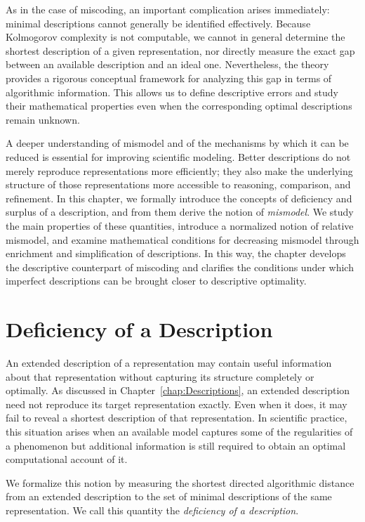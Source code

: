 As in the case of miscoding, an important complication arises immediately: minimal descriptions cannot generally be identified effectively. Because Kolmogorov complexity is not computable, we cannot in general determine the shortest description of a given representation, nor directly measure the exact gap between an available description and an ideal one. Nevertheless, the theory provides a rigorous conceptual framework for analyzing this gap in terms of algorithmic information. This allows us to define descriptive errors and study their mathematical properties even when the corresponding optimal descriptions remain unknown.

A deeper understanding of mismodel and of the mechanisms by which it can be reduced is essential for improving scientific modeling. Better descriptions do not merely reproduce representations more efficiently; they also make the underlying structure of those representations more accessible to reasoning, comparison, and refinement. In this chapter, we formally introduce the concepts of deficiency and surplus of a description, and from them derive the notion of \emph{mismodel}. We study the main properties of these quantities, introduce a normalized notion of relative mismodel, and examine mathematical conditions for decreasing mismodel through enrichment and simplification of descriptions. In this way, the chapter develops the descriptive counterpart of miscoding and clarifies the conditions under which imperfect descriptions can be brought closer to descriptive optimality.

%
%

\section{Deficiency of a Description}
\label{sec:deficiency_description}

An extended description of a representation may contain useful information about that representation without capturing its structure completely or optimally. As discussed in Chapter~\ref{chap:Descriptions}, an extended description need not reproduce its target representation exactly. Even when it does, it may fail to reveal a shortest description of that representation. In scientific practice, this situation arises when an available model captures some of the regularities of a phenomenon but additional information is still required to obtain an optimal computational account of it.

We formalize this notion by measuring the shortest directed algorithmic distance from an extended description to the set of minimal descriptions of the same representation. We call this quantity the \emph{deficiency of a description}.

